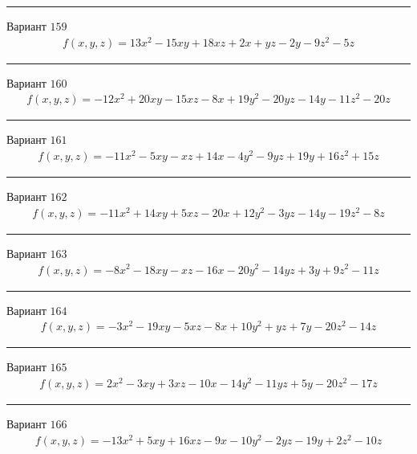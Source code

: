 \documentclass[11pt]{report}
\begin{document}
\begin{center}
\noindent\rule{8cm}{0.4pt}
\end{center}
Вариант $159$
\begin{align*}
    f(x, y, z) = 13 x^{2} - 15 x y + 18 x z + 2 x + y z - 2 y - 9 z^{2} - 5 z
\end{align*}
\begin{center}
\noindent\rule{8cm}{0.4pt}
\end{center}
Вариант $160$
\begin{align*}
    f(x, y, z) = - 12 x^{2} + 20 x y - 15 x z - 8 x + 19 y^{2} - 20 y z - 14 y - 11 z^{2} - 20 z
\end{align*}
\begin{center}
\noindent\rule{8cm}{0.4pt}
\end{center}
Вариант $161$
\begin{align*}
    f(x, y, z) = - 11 x^{2} - 5 x y - x z + 14 x - 4 y^{2} - 9 y z + 19 y + 16 z^{2} + 15 z
\end{align*}
\begin{center}
\noindent\rule{8cm}{0.4pt}
\end{center}
Вариант $162$
\begin{align*}
    f(x, y, z) = - 11 x^{2} + 14 x y + 5 x z - 20 x + 12 y^{2} - 3 y z - 14 y - 19 z^{2} - 8 z
\end{align*}
\begin{center}
\noindent\rule{8cm}{0.4pt}
\end{center}
Вариант $163$
\begin{align*}
    f(x, y, z) = - 8 x^{2} - 18 x y - x z - 16 x - 20 y^{2} - 14 y z + 3 y + 9 z^{2} - 11 z
\end{align*}
\begin{center}
\noindent\rule{8cm}{0.4pt}
\end{center}
Вариант $164$
\begin{align*}
    f(x, y, z) = - 3 x^{2} - 19 x y - 5 x z - 8 x + 10 y^{2} + y z + 7 y - 20 z^{2} - 14 z
\end{align*}
\begin{center}
\noindent\rule{8cm}{0.4pt}
\end{center}
Вариант $165$
\begin{align*}
    f(x, y, z) = 2 x^{2} - 3 x y + 3 x z - 10 x - 14 y^{2} - 11 y z + 5 y - 20 z^{2} - 17 z
\end{align*}
\begin{center}
\noindent\rule{8cm}{0.4pt}
\end{center}
Вариант $166$
\begin{align*}
    f(x, y, z) = - 13 x^{2} + 5 x y + 16 x z - 9 x - 10 y^{2} - 2 y z - 19 y + 2 z^{2} - 10 z
\end{align*}
\end{document}
